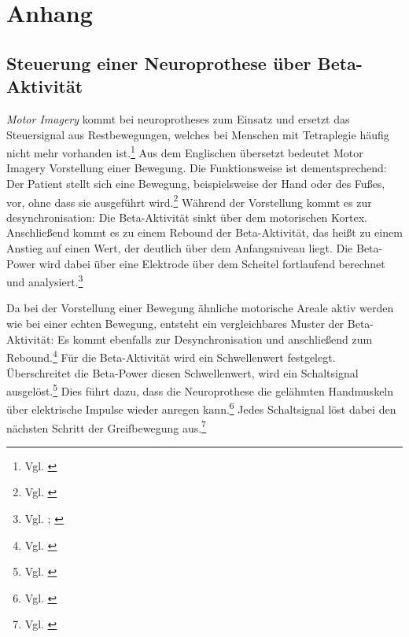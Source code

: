 \chapter*{Anhang} 
\setcounter{figure}{0}\setcounter{table}{0}
\renewcommand{\thefigure}{A.\arabic{figure}}\renewcommand{\thetable}{A.\arabic{table}}

\section*{Steuerung einer Neuroprothese über Beta-Aktivität}

\textit{Motor Imagery} kommt bei \glspl{neuroprothese} zum Einsatz und ersetzt das Steuersignal aus Restbewegungen, welches bei Menschen mit Tetraplegie häufig nicht mehr vorhanden ist.\footnote{Vgl. \cite[S.~6~f.]{rupp2014_bci_sci}} Aus dem Englischen übersetzt bedeutet Motor Imagery \glqq Vorstellung einer Bewegung\grqq{}. Die Funktionsweise ist dementsprechend: Der Patient stellt sich eine Bewegung, beispielsweise der Hand oder des Fußes, vor, ohne dass sie ausgeführt wird.\footnote{Vgl. \cite[S.~1265]{mulder2007}} Während der Vorstellung kommt es zur \gls{desynchronisation}: Die Beta-Aktivität sinkt über dem motorischen Kortex. Anschließend kommt es zu einem Rebound der Beta-Aktivität, das heißt zu einem Anstieg auf einen Wert, der deutlich über dem Anfangsniveau liegt. Die Beta-Power wird dabei über eine Elektrode über dem Scheitel fortlaufend berechnet und analysiert.\footnote{Vgl. \cite[S.~24]{pfurtscheller2009_brainswitch}; \cite[S.~1]{rhodes2024_pmbr}}

Da bei der Vorstellung einer Bewegung ähnliche motorische Areale aktiv werden wie bei einer echten Bewegung, entsteht ein vergleichbares Muster der Beta-Aktivität: Es kommt ebenfalls zur Desynchronisation und anschließend zum Rebound.\footnote{Vgl. \cite[S.~1265]{mulder2007}} Für die Beta-Aktivität wird ein Schwellenwert festgelegt. Überschreitet die Beta-Power diesen Schwellenwert, wird ein Schaltsignal ausgelöst.\footnote{Vgl. \cite[S.~24]{pfurtscheller2009_brainswitch}} Dies führt dazu, dass die Neuroprothese die gelähmten Handmuskeln über elektrische Impulse wieder anregen kann.\footnote{Vgl. \cite[S.~33--36]{pfurtscheller2003}} Jedes Schaltsignal löst dabei den nächsten Schritt der Greifbewegung aus.\footnote{Vgl. \cite[S.~169]{mullerputz2005}}


